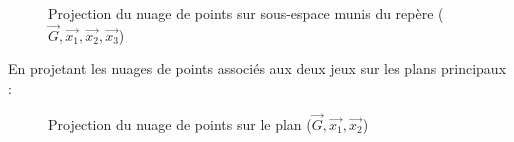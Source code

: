 \documentclass[a4paper]{article}
\begin{document}
\begin{enumerate}
\begin{figure}[H]
\centering
{}
\caption{Projection du nuage de points sur sous-espace munis du repère ($\vec{G},\vec{x_{1}},\vec{x_{2}},\vec{x_{3}}$)}\label{fig:somefiglabel}
\end{figure}
\newpage
En projetant les nuages de points associés aux deux jeux  sur les plans principaux : 

\begin{figure}[H]
\hfill
{}
\caption{Projection du nuage de points sur le plan ($\vec{G},\vec{x_{1}},\vec{x_{2}}$)}\label{fig:somefiglabel}
\end{figure}



\end{enumerate}
\end{document}
